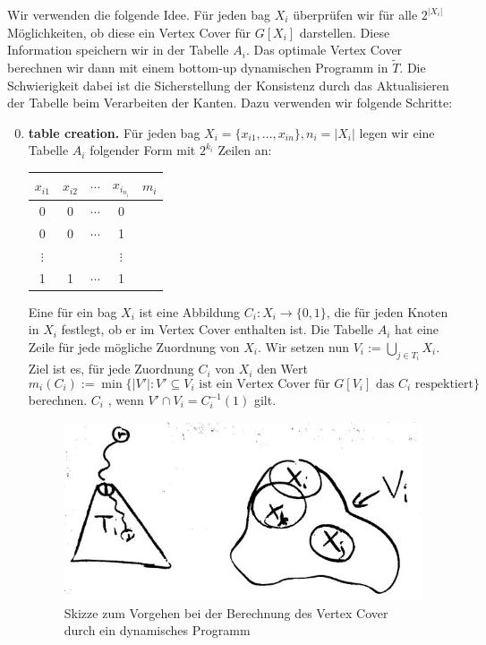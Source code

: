   Wir verwenden die folgende Idee. Für jeden bag \(X_i\) überprüfen wir für alle \(2^{|X_i|}\) Möglichkeiten, ob diese ein Vertex Cover für \(G[X_i]\) darstellen. Diese Information speichern wir in der Tabelle \(A_i\). Das optimale Vertex Cover berechnen wir dann mit einem bottom-up dynamischen Programm in \(\widetilde{T}\). Die Schwierigkeit dabei ist die Sicherstellung der Konsistenz durch das Aktualisieren der Tabelle beim Verarbeiten der Kanten. Dazu verwenden wir folgende Schritte:

  \begin{enumerate}
   \setcounter{enumi}{-1}
   \item \textbf{table creation.} Für jeden bag \(X_i = \{ x_{i1}, ..., x_{in} \}, n_i = |X_i|\) legen wir eine Tabelle \(A_i\) folgender Form mit \(2^{k_i}\) Zeilen an:
   
      \begin{center}\begin{tabular}{cccc|c}
        \(x_{i1}\) & \(x_{i2}\) & \(\cdots\) & \(x_{i_{n_i}}\) & \(m_i\) \\ \hline
        0 & 0 & \(\cdots\) & 0 \\
        0 & 0 & \(\cdots\) & 1 \\
        \(\vdots\) &  &  & \(\vdots\) \\
        1 & 1 & \(\cdots\) & 1 \\
      \end{tabular}\end{center}

      Eine  für ein bag \(X_i\) ist eine Abbildung \(C_i : X_i \to \{0,1\}\), die für jeden Knoten in \(X_i\) festlegt, ob er im Vertex Cover enthalten ist. Die Tabelle \(A_i\) hat eine Zeile für jede mögliche Zuordnung von \(X_i\). Wir setzen nun \(V_i := \bigcup_{j \in T_i} X_i\). Ziel ist es, für jede Zuordnung \(C_i\) von \(X_i\) den Wert
      \[m_i(C_i) := \min \{ |V'| : V' \subseteq V_i \text{ ist ein Vertex Cover für \(G[V_i]\) das \(C_i\) respektiert} \} \]
      berechnen. \(C_i\) , wenn \(V' \cap V_i = C_i^{-1}(1)\) gilt.

      \begin{figure}[h]
        \centering
        \includegraphics[width=.5\textwidth]{./Bilder/b04.jpg}
        \caption{Skizze zum Vorgehen bei der Berechnung des Vertex Cover durch ein dynamisches Programm}
      \end{figure}


\end{enumerate}
